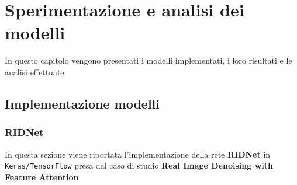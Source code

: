 \documentclass[12pt,a4paper,openright,twoside]{book}
\begin{document}
\chapter{Sperimentazione e analisi dei modelli}
In questo capitolo vengono presentati i modelli implementati, i loro risultati e le analisi effettuate.

\section{Implementazione modelli}

\subsection*{RIDNet}
In questa sezione viene riportata l'implementazione della rete \textbf{RIDNet} in \texttt{Keras/TensorFlow} presa dal caso di studio \textbf{Real Image Denoising with Feature Attention} \parencite{9010324}
\end{document}
